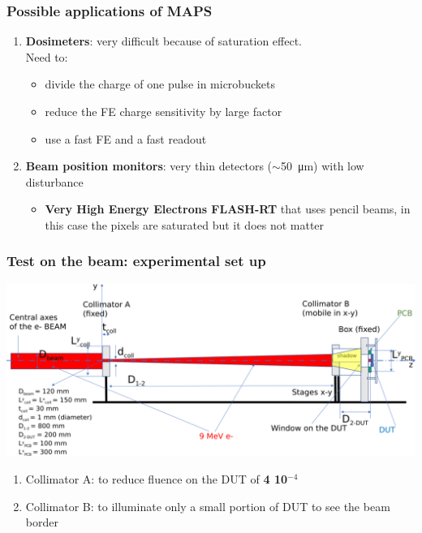     \begin{frame}
        \frametitle{Possible applications of MAPS}
        \begin{enumerate}
            \item \textbf{Dosimeters}: very difficult because of saturation effect. \\
            Need to: 
            \begin{itemize}
                \item divide the charge of one pulse in microbuckets
                \item reduce the FE charge sensitivity by large factor 
                \item use a fast FE and a fast readout
            \end{itemize}
            \bigskip
            \item \textbf{Beam position monitors}: very thin detectors ($\sim$\SI{50}{\um}) with low disturbance 
                \begin{itemize}
                    \item \textbf{Very High Energy Electrons FLASH-RT} that uses pencil beams, in this case the pixels are saturated but it does not matter
                \end{itemize}
        \end{enumerate}
    \end{frame}     


    \begin{frame}
        \frametitle{Test on the beam: experimental set up}
        \smallskip
        \includegraphics[width=.95\linewidth]{figures/test_beam/Flash-beam-scheme.pdf}\\
        \smallskip
        \begin{enumerate}
            \item Collimator A: to reduce fluence on the DUT of \textbf{4 10$^{-4}$}
            \item Collimator B: to illuminate only a small portion of DUT to see the beam border
        \end{enumerate}
        
    \end{frame}    


